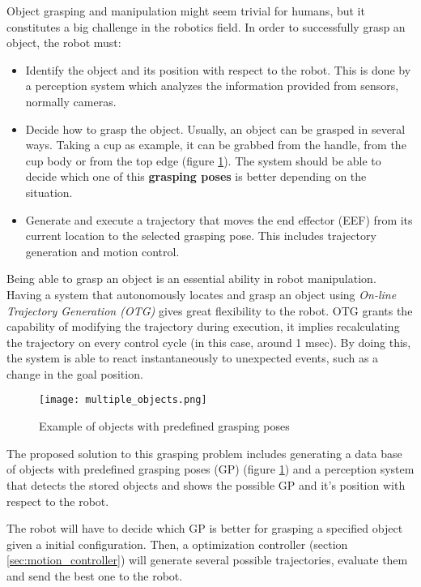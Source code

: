 Object grasping and manipulation might seem trivial for humans, but it constitutes a big challenge in the robotics field. In order to successfully grasp an object, the robot must:
\begin{itemize}
	\item Identify the object and its position with respect to the robot. This is done by a perception system which analyzes the information provided from sensors, normally cameras.
	\item Decide how to grasp the object. Usually, an object can be grasped in several ways. Taking a cup as example, it can be grabbed from the handle, from the cup body or from the top edge (figure \ref{fig:obj_grasp_pose}). The system should be able to decide which one of this \textbf{grasping poses} is better depending on the situation.
	\item Generate and execute a trajectory that moves the end effector (EEF) from its current location to the selected grasping pose. This includes trajectory generation and motion control.
\end{itemize}

Being able to grasp an object is an essential ability in robot manipulation. Having a system that autonomously locates and grasp an object using \textit{On-line Trajectory Generation (OTG)} gives great flexibility to the robot. OTG grants the capability of modifying the trajectory during execution, it implies recalculating the trajectory on every control cycle (in this case, around 1 msec). By doing this, the system is able to react instantaneously to unexpected events, such as a change in the goal position.

\begin{figure}[H]
	\centering
	\texttt{[image: multiple\_objects.png]}
	\vspace{-10pt}
	\caption{Example of objects with predefined grasping poses}
	\vspace{-15pt}
	\label{fig:obj_grasp_pose}
\end{figure}

The proposed solution to this grasping problem includes generating a data base of objects with predefined grasping poses (GP) (figure \ref{fig:obj_grasp_pose}) and a perception system that detects the stored objects and shows the possible GP and it's position with respect to the robot.

The robot will have to decide which GP is better for grasping a specified object given a initial configuration. Then, a optimization controller (section \ref{sec:motion_controller}) will generate several possible trajectories, evaluate them and send the best one to the robot.


